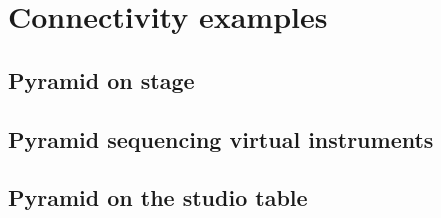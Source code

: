 \chapter{Connectivity examples}

\section{Pyramid on stage}


\section{Pyramid sequencing virtual instruments}


\section{Pyramid on the studio table}



